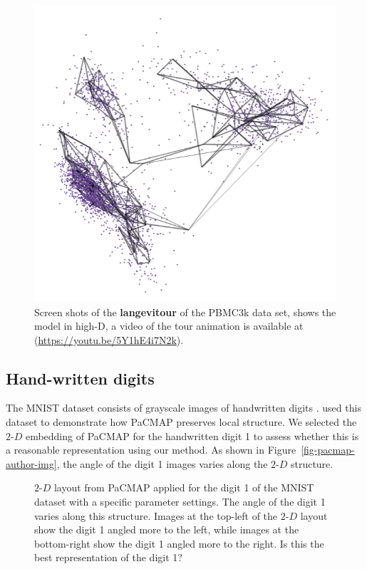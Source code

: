 \documentclass[
  12pt]{article}
\newcommand\gD{$2\text{-}D$}
\begin{document}
\begin{figure}[H]
%
\begin{minipage}{0.33\linewidth}
\includegraphics{figures/pbmc3k/sc_6.png}\end{minipage}%

\caption{\label{fig-pbmc2-sc}Screen shots of the \textbf{langevitour} of
the PBMC3k data set, shows the model in high-D, a video of the tour
animation is available at (\url{https://youtu.be/5Y1hE4i7N2k}).}

\end{figure}%

\subsection{Hand-written digits}\label{hand-written-digits}

The MNIST dataset consists of grayscale images of handwritten digits
\citep{lecun2010}. \citet{yingfan2021} used this dataset to demonstrate
how PaCMAP preserves local structure. We selected the \gD{} embedding of
PaCMAP for the handwritten digit 1 to assess whether this is a
reasonable representation using our method. As shown in
Figure~\ref{fig-pacmap-author-img}, the angle of the digit 1 images
varies along the \gD{} structure.

\begin{figure}[H]


\caption{\label{fig-pacmap-author}\(2\text{-}D\) layout from PaCMAP
applied for the digit 1 of the MNIST dataset with a specific parameter
settings. The angle of the digit 1 varies along this structure. Images
at the top-left of the \(2\text{-}D\) layout show the digit 1 angled
more to the left, while images at the bottom-right show the digit 1
angled more to the right. Is this the best representation of the digit
1?}

\end{figure}%
\end{document}
